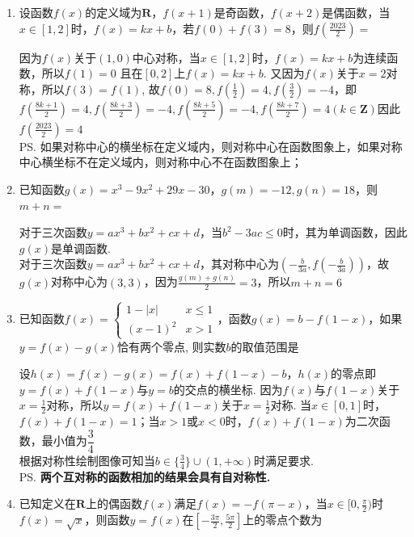 \begin{enumerate}
    \item 设函数$f(x)$的定义域为$\mathbf{R}$，$f(x+1)$是奇函数，$f(x+2)$是偶函数，当$x \in [1, 2]$时，$f(x) = kx+b$，若$f(0) + f(3) = 8$，则$f(\frac{2023}{2}) = $
    \begin{jieda}
    因为$f(x)$关于$(1, 0)$中心对称，当$x \in [1, 2]$时，$f(x) = kx+b$为连续函数，所以$f(1) = 0$ 且在$[0, 2]$上$f(x) = kx+b$. 又因为$f(x)$关于$x = 2$对称，所以$f(3) = f(1)$, 故$f(0) = 8, f(\frac{1}{2}) = 4, f(\frac{3}{2}) = -4$，即$f(\frac{8k+1}{2}) = 4, f(\frac{8k+3}{2}) = -4, f(\frac{8k+5}{2}) = -4, f(\frac{8k+7}{2}) = 4 (k \in \mathbf{Z})$因此$f(\frac{2023}{2}) = 4$ \\
    \ps 如果对称中心的横坐标在定义域内，则对称中心在函数图象上，如果对称中心横坐标不在定义域内，则对称中心不在函数图象上；
    \end{jieda}
    \item 已知函数$g(x) = x^3 - 9x^2 + 29x - 30$，$g(m) = -12, g(n) = 18$，则$m+n = $
    \begin{jieda}
        对于三次函数$y = ax^3+bx^2+cx+d$，当$b^2 - 3ac \leq 0$时，其为单调函数，因此$g(x)$是单调函数. \\
        对于三次函数$y = ax^3+bx^2+cx+d$，其对称中心为$(-\frac{b}{3a}, f(-\frac{b}{3a}))$，故$g(x)$对称中心为$(3, 3)$，因为$\frac{g(m) + g(n)}{2} = 3$，所以$m+n = 6$
    \end{jieda}
    \item 已知函数$f(x) = \left \{ \begin{array}{ll}
        1 - |x| & x \leq 1 \\
        (x-1)^2 & x > 1
    \end{array}\right.$，函数$g(x) = b - f(1-x)$，如果$y = f(x) - g(x)$恰有两个零点, 则实数$b$的取值范围是
    \begin{jieda}
        设$h(x) = f(x) - g(x) = f(x) + f(1-x) - b$，$h(x)$的零点即$y = f(x) + f(1-x)$与$y = b$的交点的横坐标. 因为$f(x)$与$f(1-x)$关于$x = \frac{1}{2}$对称，所以$y = f(x) + f(1-x)$关于$x = \frac{1}{2}$对称. 当$x \in [0, 1]$时，$f(x) + f(1-x) = 1$；当$x > 1$或$x < 0$时，$f(x) + f(1-x)$为二次函数，最小值为$\dfrac{3}{4}$ \\
        根据对称性绘制图像可知当$b \in \{\frac{3}{4}\} \cup (1, +\infty)$时满足要求. \\
        \ps \textbf{两个互对称的函数相加的结果会具有自对称性.}
    \end{jieda}
    \item 已知定义在$\mathbf{R}$上的偶函数$f(x)$满足$f(x) = -f(\pi - x)$，当$x \in [0, \frac{\pi}{2})$时$f(x) = \sqrt{x}$，则函数$y = f(x)$在$[-\frac{3\pi}{2}, \frac{5\pi}{2}]$上的零点个数为

\end{enumerate}
